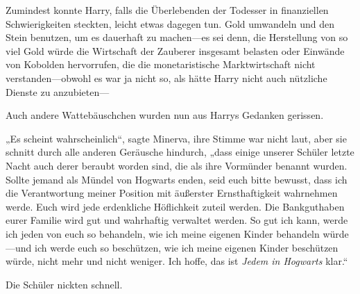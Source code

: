 Zumindest konnte Harry, falls die Überlebenden der Todesser in finanziellen Schwierigkeiten steckten, leicht etwas dagegen tun. Gold umwandeln und den Stein benutzen, um es dauerhaft zu machen—es sei denn, die Herstellung von so viel Gold würde die Wirtschaft der Zauberer insgesamt belasten oder Einwände von Kobolden hervorrufen, die die monetaristische Marktwirtschaft nicht verstanden—obwohl es war ja nicht so, als hätte Harry nicht auch nützliche Dienste zu anzubieten—

Auch andere Wattebäuschchen wurden nun aus Harrys Gedanken gerissen.

„Es scheint wahrscheinlich“, sagte Minerva, ihre Stimme war nicht laut, aber sie schnitt durch alle anderen Geräusche hindurch, „dass einige unserer Schüler letzte Nacht auch derer beraubt worden sind, die als ihre Vormünder benannt wurden. Sollte jemand als Mündel von Hogwarts enden, seid euch bitte bewusst, dass ich die Verantwortung meiner Position mit äußerster Ernsthaftigkeit wahrnehmen werde. Euch wird jede erdenkliche Höflichkeit zuteil werden. Die Bankguthaben eurer Familie wird gut und wahrhaftig verwaltet werden. So gut ich kann, werde ich jeden von euch so behandeln, wie ich meine eigenen Kinder behandeln würde—und ich werde euch so beschützen, wie ich meine eigenen Kinder beschützen würde, nicht mehr und nicht weniger. Ich hoffe, das ist \emph{Jedem in Hogwarts} klar.“

Die Schüler nickten schnell.

